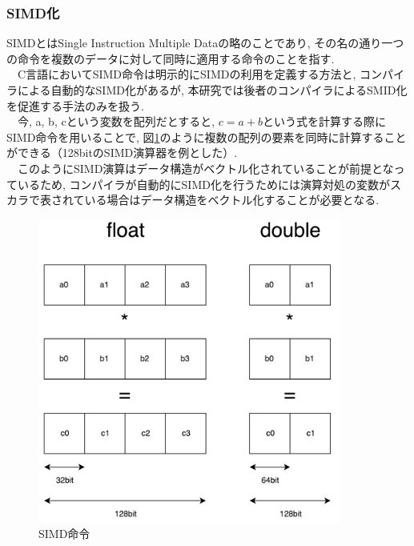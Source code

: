 \subsubsection{SIMD化}
\label{subsubsec:simd}
SIMDとはSingle Instruction Multiple Dataの略のことであり, その名の通り一つの命令を複数のデータに対して同時に適用する命令のことを指す.\\
　C言語においてSIMD命令は明示的にSIMDの利用を定義する方法と, コンパイラによる自動的なSIMD化があるが,
本研究では後者のコンパイラによるSMID化を促進する手法のみを扱う.\\
　今, a, b, cという変数を配列だとすると, $c = a + b$という式を計算する際にSIMD命令を用いることで,
図\ref{fig:simd-image}のように複数の配列の要素を同時に計算することができる（128bitのSIMD演算器を例とした）.\\
　このようにSIMD演算はデータ構造がベクトル化されていることが前提となっているため,
コンパイラが自動的にSIMD化を行うためには演算対処の変数がスカラで表されている場合はデータ構造をベクトル化することが必要となる.\\
\begin{figure}[htb]
 \begin{center}
    \includegraphics[width=10cm]{./images/SIMD.pdf}
    \caption{SIMD命令}
    \label{fig:simd-image}
  \end{center}
\end{figure}~\\

